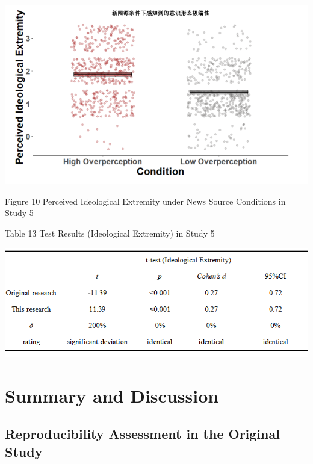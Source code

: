 \documentclass[
  man]{apa6}
\begin{document}
\begin{enumerate}
  \begin{center}
  \includegraphics{study5_3.png}
  \end{center}
  \begin{center}
  Figure 10 Perceived Ideological Extremity under News Source Conditions in Study 5
  \end{center}
  \begin{center}
  Table 13 Test Results (Ideological Extremity) in Study 5
  \end{center}
  \begin{center}
  \includegraphics{test_result.png}
  \end{center}
\end{enumerate}

\hypertarget{summary-and-discussion}{%
\section{Summary and Discussion}\label{summary-and-discussion}}

\hypertarget{reproducibility-assessment-in-the-original-study}{%
\subsection{Reproducibility Assessment in the Original Study}\label{reproducibility-assessment-in-the-original-study}}
\end{document}

